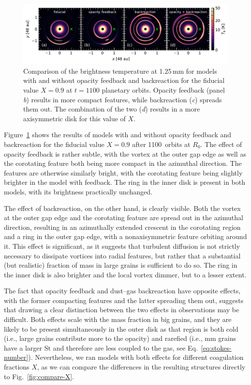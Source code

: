 \documentclass[fleqn,usenatbib,useAMS]{mnras}
\newcommand{\St}{\mathrm{St}}
\begin{document}
\begin{figure}
	\centering
	\includegraphics[width=\textwidth]{compare-feedback-ext.pdf}
	\caption{Comparison of the brightness temperature at 1.25\,mm for models with and without opacity feedback and backreaction for the fiducial value $X=0.9$ at $t=1100$ planetary orbits. Opacity feedback (panel \emph{b}) results in more compact features, while backreaction (\emph{c}) spreads them out. The combination of the two (\emph{d}) results in a more axisymmetric disk for this value of $X$.}
	\label{fig:compare-feedback}
\end{figure}
%
Figure~\ref{fig:compare-feedback} shows the results of models with and without opacity feedback and backreaction for the fiducial value $X=0.9$ after 1100~orbits at $R_0$. The effect of opacity feedback is rather subtle, with the vortex at the outer gap edge as well as the corotating feature both being more compact in the azimuthal direction. The features are otherwise similarly bright, with the corotating feature being slightly brighter in the model with feedback. The ring in the inner disk is present in both models, with its brightness practically unchanged.

The effect of backreaction, on the other hand, is clearly visible. Both the vortex at the outer gap edge and the corotating feature are spread out in the azimuthal direction, resulting in an azimuthally extended crescent in the corotating region and a ring in the outer gap edge, with a nonaxisymmetric feature orbiting around it. This effect is significant, as it suggests that turbulent diffusion is not strictly necessary to dissipate vortices into radial features, but rather that a substantial (but realistic) fraction of mass in large grains is sufficient to do so. The ring in the inner disk is also brighter and the local vortex dimmer, but to a lesser extent.

The fact that opacity feedback and dust--gas backreaction have opposite effects, with the former compacting features and the latter spreading them out, suggests that drawing a clear distinction between the two effects in observations may be difficult. Both effects scale with the mass fraction in big grains, and they are likely to be present simultaneously in the outer disk as that region is both cold (i.e., large grains contribute more to the opacity) and rarefied (i.e., mm grains have a larger $\St$ and therefore are less coupled to the gas, see Eq.~\eqref{eq:stokes-number}). Nevertheless, we ran models with both effects for different coagulation fractions $X$, as we can compare the differences in the resulting structures directly to Fig.~\ref{fig:compare-X}.
\end{document}
